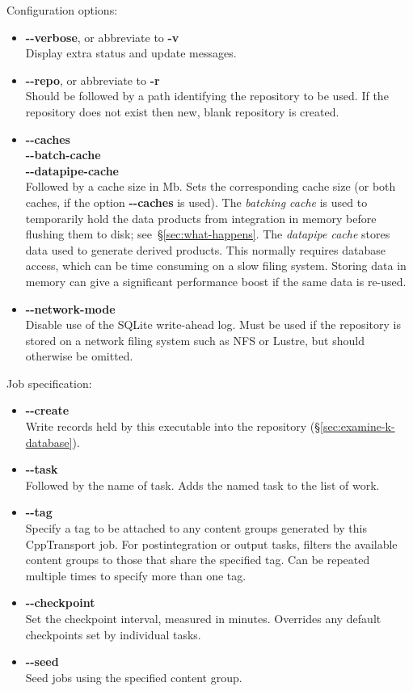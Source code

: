 \documentclass[11pt,a4paper]{article}
\newcommand{\packagefont}{\sffamily}
\newcommand{\CppTransport}{{\packagefont CppTransport}}
\newcommand{\SQLite}{{\packagefont SQLite}}
\newcommand{\option}[1]{{\ttfamily\bfseries\small #1}}
\begin{document}
\noindent Configuration options:
\begin{itemize}
	\item \option{{-}{-}verbose}, or abbreviate to \option{-v} \\
	Display extra status and update messages.
	
	\item \option{{-}{-}repo}, or abbreviate to \option{-r} \\
	Should be followed by a path identifying the repository to be used.
	If the repository does not exist then new, blank repository is created.
	
	\item \option{{-}{-}caches} \\
	\option{{-}{-}batch-cache} \\
	\option{{-}{-}datapipe-cache} \\
	Followed by a cache size in Mb. Sets the corresponding cache size
	(or both caches, if the option \option{{-}{-}caches} is used).
	The \emph{batching cache} is used to temporarily
	hold the data products from integration in memory before
	flushing them to disk; see~\S\ref{sec:what-happens}.
	The \emph{datapipe cache} stores data used to generate derived products.
	This normally requires database access, which can be time consuming on a slow
	filing system. Storing data in memory can give a significant performance
	boost if the same data is re-used.
	
	\item \option{{-}{-}network-mode} \\
	Disable use of the {\SQLite} write-ahead log. Must be used if the repository
	is stored on a network filing system such as NFS or Lustre, but should
	otherwise be omitted.
\end{itemize}

\noindent Job specification:
\begin{itemize}
	\item \option{{-}{-}create} \\
	Write records held by this executable into the repository (\S\ref{sec:examine-k-database}).
	
	\item \option{{-}{-}task} \\
	Followed by the name of task. Adds the named task to the list of work.
	
	\item \option{{-}{-}tag} \\
	Specify a tag to be attached to any content groups generated by this
	{\CppTransport} job.
	For postintegration or output tasks,
	filters the available content groups to those that share the specified tag.
	Can be repeated multiple times to specify more than one tag.
	
	\item \option{{-}{-}checkpoint} \\
	Set the checkpoint interval, measured in minutes.
	Overrides any default checkpoints set by individual tasks.
	
	\item \option{{-}{-}seed} \\
	Seed jobs using the specified content group.	
\end{itemize}
\end{document}
